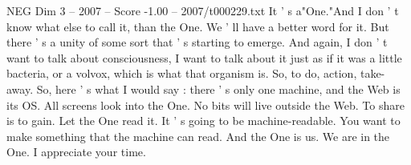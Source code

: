 \begin{textsample}{NEG Dim 3 – 2007 – Score -1.00 – 2007/t000229.txt}
It ' s a"One."And I don ' t know what else to call it, than the One.
We ' ll have a better word for it.
But there ' s a unity of some sort that ' s starting to emerge.
And again, I don ' t want to talk about consciousness, I want to talk about it just as if it was a little bacteria, or a volvox, which is what that organism is.
So, to do, action, take-away.
So, here ' s what I would say : there ' s only one machine, and the Web is its OS.
All screens look into the One.
No bits will live outside the Web.
To share is to gain.
Let the One read it.
It ' s going to be machine-readable.
You want to make something that the machine can read.
And the One is us.
We are in the One.
I appreciate your time.

\end{textsample}
